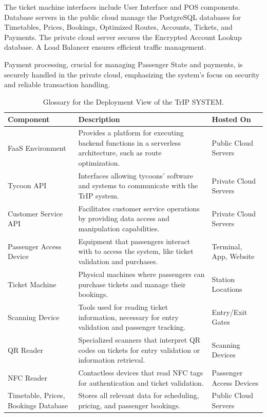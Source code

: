 The ticket machine interfaces include User Interface and POS components. Database servers in the public cloud manage the PostgreSQL databases for Timetables, Prices, Bookings, Optimized Routes, Accounts, Tickets, and Payments. The private cloud server secures the Encrypted Account Lookup database. A Load Balancer ensures efficient traffic management.

Payment processing, crucial for managing Passenger State and payments, is securely handled in the private cloud, emphasizing the system's focus on security and reliable transaction handling. 


\begin{table}[H]
    \centering
    \caption{Glossary for the Deployment View of the TrIP SYSTEM.}
    \label{tab:deployment_view_glossary}
    \begin{tabularx}{\textwidth}{@{}lXX@{}} %
    \toprule
    \textbf{Component} & \textbf{Description} & \textbf{Hosted On} \\
    \midrule
    FaaS Environment & Provides a platform for executing backend functions in a serverless architecture, such as route optimization. & Public Cloud Servers \\
    Tycoon API & Interfaces allowing tycoons' software and systems to communicate with the TrIP system. & Private Cloud Servers \\
    Customer Service API & Facilitates customer service operations by providing data access and manipulation capabilities. & Private Cloud Servers \\
    Passenger Access Device & Equipment that passengers interact with to access the system, like ticket validation and purchases. & Terminal, App, Website \\
    Ticket Machine & Physical machines where passengers can purchase tickets and manage their bookings. & Station Locations \\
    Scanning Device & Tools used for reading ticket information, necessary for entry validation and passenger tracking. & Entry/Exit Gates \\
    QR Reader & Specialized scanners that interpret QR codes on tickets for entry validation or information retrieval. & Scanning Devices \\
    NFC Reader & Contactless devices that read NFC tags for authentication and ticket validation. & Passenger Access Devices \\
    Timetable, Prices, Bookings Database & Stores all relevant data for scheduling, pricing, and passenger bookings. & Public Cloud Servers \\

\end{tabularx}
\end{table}
